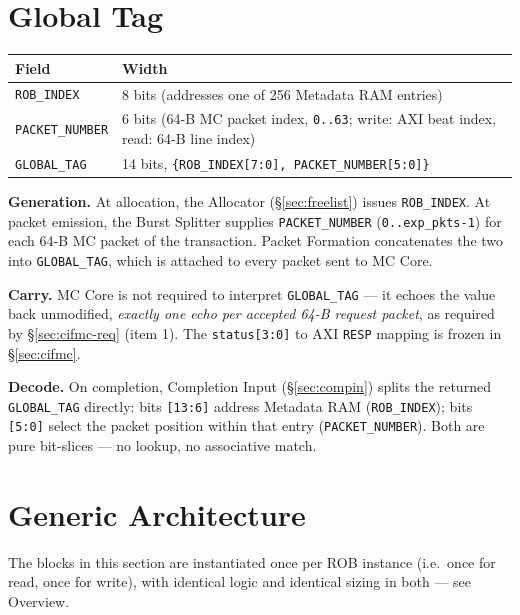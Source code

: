 \section{Global Tag}
\label{sec:tag}

\begin{center}
\begin{tabular}{ll}
\toprule
\textbf{Field} & \textbf{Width} \\
\midrule
\texttt{ROB\_INDEX}     & 8 bits (addresses one of 256 Metadata RAM entries) \\
\texttt{PACKET\_NUMBER} & 6 bits (64-B MC packet index, \texttt{0..63}; write: AXI beat index, read: 64-B line index) \\
\midrule
\texttt{GLOBAL\_TAG}    & 14 bits, \texttt{\{ROB\_INDEX[7:0], PACKET\_NUMBER[5:0]\}} \\
\bottomrule
\end{tabular}
\end{center}

\textbf{Generation.} At allocation, the Allocator (\S\ref{sec:freelist}) issues \texttt{ROB\_INDEX}. At packet emission, the Burst Splitter supplies \texttt{PACKET\_NUMBER} (\texttt{0..exp\_pkts-1}) for each 64-B MC packet of the transaction. Packet Formation concatenates the two into \texttt{GLOBAL\_TAG}, which is attached to every packet sent to MC Core.

\textbf{Carry.} MC Core is not required to interpret \texttt{GLOBAL\_TAG} --- it echoes the value back unmodified, \emph{exactly one echo per accepted 64-B request packet}, as required by \S\ref{sec:cifmc-req} (item 1). The \texttt{status[3:0]} to AXI \texttt{RESP} mapping is frozen in \S\ref{sec:cifmc}.

\textbf{Decode.} On completion, Completion Input (\S\ref{sec:compin}) splits the returned \texttt{GLOBAL\_TAG} directly: bits \texttt{[13:6]} address Metadata RAM (\texttt{ROB\_INDEX}); bits \texttt{[5:0]} select the packet position within that entry (\texttt{PACKET\_NUMBER}). Both are pure bit-slices --- no lookup, no associative match.

\section{Generic Architecture}
\label{sec:generic}

The blocks in this section are instantiated once per ROB instance (i.e.\ once for read, once for write), with identical logic and identical sizing in both --- see Overview.

